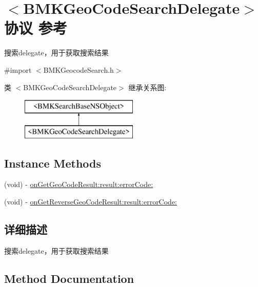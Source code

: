 \hypertarget{protocol_b_m_k_geo_code_search_delegate-p}{}\section{$<$B\+M\+K\+Geo\+Code\+Search\+Delegate$>$协议 参考}
\label{protocol_b_m_k_geo_code_search_delegate-p}


搜索delegate，用于获取搜索结果  




{\ttfamily \#import $<$B\+M\+K\+Geocode\+Search.\+h$>$}

类 $<$B\+M\+K\+Geo\+Code\+Search\+Delegate$>$ 继承关系图\+:\begin{figure}[H]
\begin{center}
\leavevmode
\includegraphics[height=2.000000cm]{protocol_b_m_k_geo_code_search_delegate-p}
\end{center}
\end{figure}
\subsection*{Instance Methods}
\begin{DoxyCompactItemize}
\item 
(void) -\/ \hyperlink{protocol_b_m_k_geo_code_search_delegate-p_ac50237b58058d88d46ad0a4c99208382}{on\+Get\+Geo\+Code\+Result\+:result\+:error\+Code\+:}
\item 
(void) -\/ \hyperlink{protocol_b_m_k_geo_code_search_delegate-p_a8b9139623a45d9366e38bd000c1369c0}{on\+Get\+Reverse\+Geo\+Code\+Result\+:result\+:error\+Code\+:}
\end{DoxyCompactItemize}


\subsection{详细描述}
搜索delegate，用于获取搜索结果 

\subsection{Method Documentation}
\hypertarget{protocol_b_m_k_geo_code_search_delegate-p_ac50237b58058d88d46ad0a4c99208382}{}
